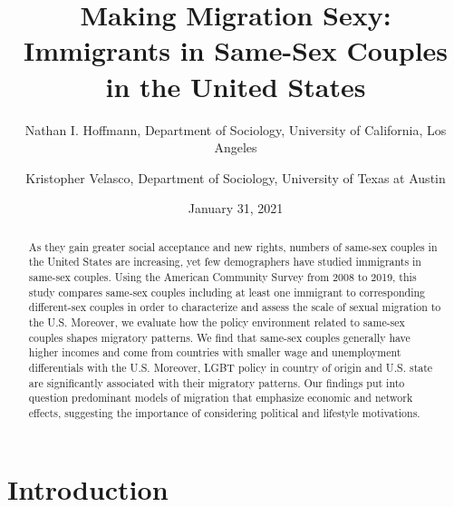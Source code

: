 \documentclass[
  11pt,
]{article}
\title{Making Migration Sexy: Immigrants in Same-Sex Couples in the United States}
\author{Nathan I. Hoffmann, Department of Sociology, University of California, Los Angeles \and Kristopher Velasco, Department of Sociology, University of Texas at Austin}
\date{January 31, 2021}
\begin{document}
\maketitle
\begin{abstract}
As they gain greater social acceptance and new rights, numbers of same-sex couples in the United States are increasing, yet few demographers have studied immigrants in same-sex couples. Using the American Community Survey from 2008 to 2019, this study compares same-sex couples including at least one immigrant to corresponding different-sex couples in order to characterize and assess the scale of sexual migration to the U.S. Moreover, we evaluate how the policy environment related to same-sex couples shapes migratory patterns. We find that same-sex couples generally have higher incomes and come from countries with smaller wage and unemployment differentials with the U.S. Moreover, LGBT policy in country of origin and U.S. state are significantly associated with their migratory patterns. Our findings put into question predominant models of migration that emphasize economic and network effects, suggesting the importance of considering political and lifestyle motivations.
\end{abstract}

\hypertarget{introduction}{%
\section{Introduction}\label{introduction}}
\end{document}
